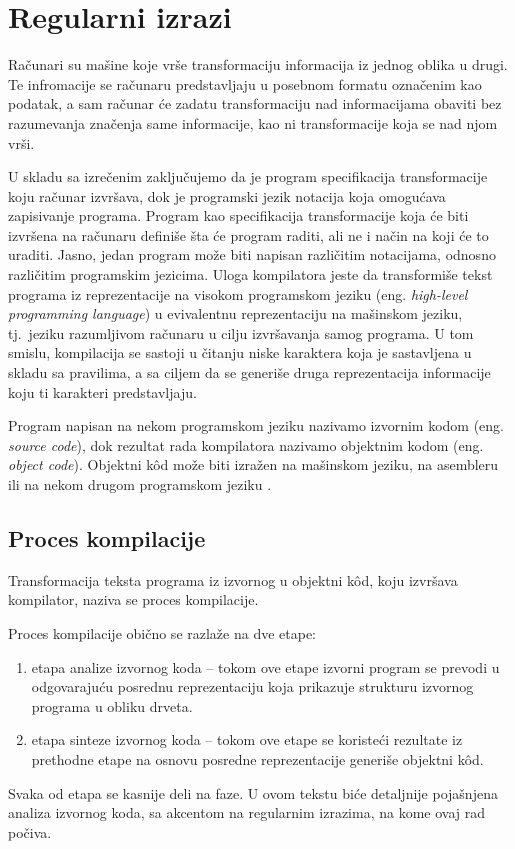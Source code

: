 \documentclass[12pt,oneside]{memoir}
\theoremstyle{plain}
\theoremstyle{definition}
\begin{document}
\chapter{Regularni izrazi}
Računari su mašine koje vrše transformaciju informacija iz jednog oblika u drugi. Te infromacije se računaru predstavljaju u posebnom formatu označenim  kao podatak, a sam računar će zadatu transformaciju nad informacijama obaviti bez razumevanja značenja same informacije, kao ni transformacije koja se nad njom vrši.

U skladu sa izrečenim zaključujemo da je program specifikacija transformacije koju računar izvršava, dok je programski jezik notacija koja omogućava zapisivanje programa. Program kao specifikacija transformacije koja će biti izvršena na računaru definiše šta će program raditi, ali ne i način na koji će to uraditi. Jasno, jedan program može biti napisan različitim notacijama, odnosno različitim programskim jezicima. Uloga kompilatora jeste da transformiše tekst programa iz reprezentacije na visokom programskom jeziku (eng. \textit{high-level programming language}) u evivalentnu reprezentaciju na mašinskom jeziku, tj.~jeziku razumljivom računaru u cilju izvršavanja samog programa. U tom smislu, kompilacija se sastoji u čitanju niske karaktera koja je sastavljena u skladu sa pravilima, a sa ciljem da se generiše druga reprezentacija informacije koju ti karakteri predstavljaju.

Program napisan na nekom programskom jeziku nazivamo izvornim kodom  (eng. \textit{source code}), dok rezultat rada kompilatora nazivamo objektnim kodom (eng. \textit{object code}). Objektni k\^od može biti izražen na mašinskom jeziku, na asembleru ili na nekom drugom programskom jeziku \cite{Vitas}. 

\section{Proces kompilacije}
Transformacija teksta programa iz izvornog u objektni k\^od, koju izvršava kompilator, naziva se proces kompilacije.

Proces kompilacije obično se razlaže na dve etape:
\begin{enumerate}
\item etapa analize izvornog koda – tokom ove etape izvorni program se prevodi u odgovarajuću posrednu reprezentaciju koja prikazuje strukturu izvornog programa u obliku drveta.
\item etapa sinteze izvornog koda – tokom ove etape se koristeći rezultate iz prethodne etape na osnovu posredne reprezentacije generiše objektni k\^od.
\end{enumerate}
Svaka od etapa se kasnije deli na faze. U ovom tekstu biće detaljnije pojašnjena analiza izvornog koda, sa akcentom na regularnim izrazima, na kome ovaj rad počiva.
\end{document}
